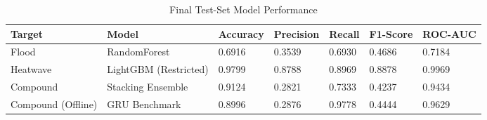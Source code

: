 \begin{table}[t]
\centering
\caption{Final Test-Set Model Performance}
\label{tab:performance}
\begin{tabular}{@{}lllllll@{}}
\toprule
\textbf{Target} & \textbf{Model} & \textbf{Accuracy} & \textbf{Precision} & \textbf{Recall} & \textbf{F1-Score} & \textbf{ROC-AUC} \\
\midrule
Flood & RandomForest & 0.6916 & 0.3539 & 0.6930 & 0.4686 & 0.7184 \\
Heatwave & LightGBM (Restricted) & 0.9799 & 0.8788 & 0.8969 & 0.8878 & 0.9969 \\
Compound & Stacking Ensemble & 0.9124 & 0.2821 & 0.7333 & 0.4237 & 0.9434 \\
Compound (Offline) & GRU Benchmark & 0.8996 & 0.2876 & 0.9778 & 0.4444 & 0.9629 \\
\bottomrule
\end{tabular}
\end{table}
